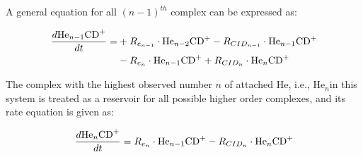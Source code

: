 A general equation for all $(n-1)^{th}$ complex can be expressed as:

\begin{equation}
    \begin{split}
        \frac{d\text{He}_{n-1}\text{CD}^+}{dt} = & +R_{e_{n-1}} \cdot \text{He}_{n-2}\text{CD}^+ - R_{CID_{n-1}} \cdot \text{He}_{n-1}\text{CD}^+ \\
        & -R_{e_n} \cdot \text{He}_{n-1}\text{CD}^+ + R_{CID_n} \cdot \text{He}_n\text{CD}^+
    \end{split}
    \label{eqn:rate:n-1thcomplexes}
\end{equation}

The complex with the highest observed number $n$ of attached He, i.e., He$_n$\CD in this system is treated as a reservoir for all possible higher order complexes, and its rate equation is given as:

\begin{equation}
    \frac{d\text{He}_{n}\text{CD}^+}{dt} = R_{e_n} \cdot \text{He}_{n-1}\text{CD}^+ - R_{CID_n} \cdot \text{He}_{n}\text{CD}^+
    \label{eqn:rate:nth-complexes}
\end{equation}
